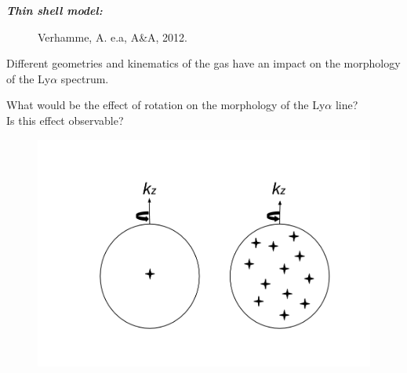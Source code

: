 \documentclass{beamer}
\begin{document}

\begin{frame}{\textit{\textbf{Thin shell model:}}}
\begin{figure}
\caption*{Verhamme, A. e.a, A\&A, 2012.}
\end{figure}
\end{frame}

\begin{frame}
\LARGE{Different geometries and kinematics of the gas have an impact on the morphology of the
Ly$\alpha$ spectrum.}\\

\end{frame}



\begin{frame}
\LARGE{What would be the effect of rotation on the morphology of the Ly$\alpha$ line?\\ 
Is this effect observable?} 
\end{frame}


\begin{frame}
\begin{figure}
\includegraphics[scale=0.3]{Figures/models.png}
\end{figure}
\end{frame}
\end{document}
